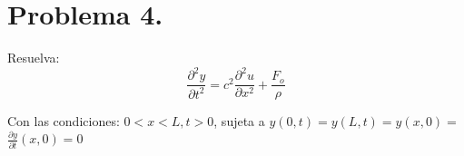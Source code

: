 \section{Problema 4.} Resuelva: $$\frac{\partial^{2} y}{\partial t^{2}}=c^{2} \frac{\partial^{2} u}{\partial x^{2}}+\frac{F_{o}}{\rho}$$

Con las condiciones: $0<x<L, t>0$, sujeta a $y(0, t)=y(L, t)=y(x, 0)=$
$\frac{\partial y}{\partial t}(x, 0)=0$